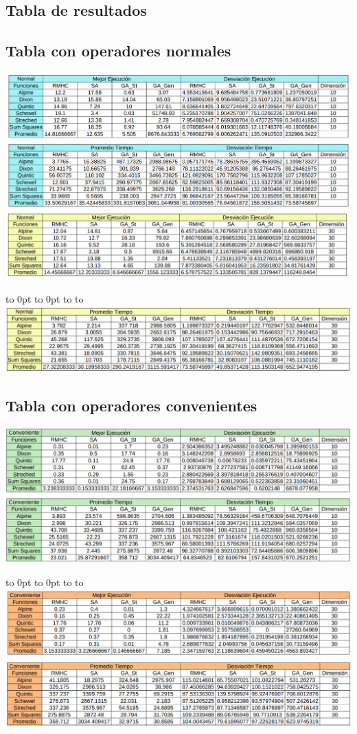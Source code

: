 \documentclass[10pt]{article}
\def\fillandplacepagenumber{%
 \par\pagestyle{empty}%
 \vbox to 0pt{\vss}\vfill
 \vbox to 0pt{\baselineskip0pt
   \hbox to\linewidth{\hss}%
   \baselineskip\footskip
   \hbox to\linewidth{%
     \hfil\thepage\hfil}\vss}}
\begin{document}
\begin{landscape}
  \section{Tabla de resultados}
  \subsection{Tabla con operadores normales}
  \includegraphics[scale=0.5]{imgs/tabla_1.png}\\
  \includegraphics[scale=0.5]{imgs/tabla_2.png}
  \fillandplacepagenumber
  \clearpage
  \includegraphics[scale=0.5]{imgs/tabla_3.png}
  \subsection{Tabla con operadores convenientes}
  \includegraphics[scale=0.5]{imgs/tabla_4.png}
  \fillandplacepagenumber
  \clearpage
  \includegraphics[scale=0.5]{imgs/tabla_5.png}\\
  \includegraphics[scale=0.5]{imgs/tabla_6.png}

\end{landscape}
\end{document}
